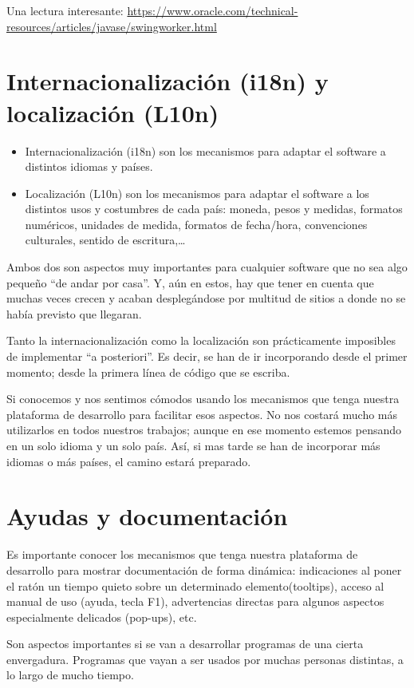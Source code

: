 \documentclass[spanish,12pt,a4paper,final,oneside]{book}
\begin{document}
Una lectura interesante: \url{https://www.oracle.com/technical-resources/articles/javase/swingworker.html}


\section{Internacionalización (i18n) y localización (L10n)}\label{ejercicio_localizacion}
\begin{itemize}
\item Internacionalización (i18n) son los mecanismos para adaptar el software a distintos idiomas y países.
\item Localización (L10n) son los mecanismos para adaptar el software a los distintos usos y costumbres de cada país: moneda, pesos y medidas, formatos numéricos, unidades de medida, formatos de fecha/hora, convenciones culturales, sentido de escritura,\ldots
\end{itemize}

Ambos dos son aspectos muy importantes para cualquier software que no sea algo pequeño ``de andar por casa''. Y, aún en estos, hay que tener en cuenta que muchas veces crecen y acaban desplegándose por multitud de sitios a donde no se había previsto que llegaran.

Tanto la internacionalización como la localización son prácticamente imposibles de implementar ``a posteriori''. Es decir, se han de ir incorporando desde el primer momento; desde la primera línea de código que se escriba.

Si conocemos y nos sentimos cómodos usando los mecanismos que tenga nuestra plataforma de desarrollo para facilitar esos aspectos. No nos costará mucho más utilizarlos en todos nuestros trabajos; aunque en ese momento estemos pensando en un solo idioma y un solo país. Así, si mas tarde se han de incorporar más idiomas o más países, el camino estará preparado.


\section{Ayudas y documentación}\label{ejercicio_ayudas}
Es importante conocer los mecanismos que tenga nuestra plataforma de desarrollo para mostrar documentación de forma dinámica: indicaciones al poner el ratón un tiempo quieto sobre un determinado elemento(tooltips), acceso al manual de uso (ayuda, tecla F1), advertencias directas para algunos aspectos especialmente delicados (pop-ups), etc.

Son aspectos importantes si se van a desarrollar programas de una cierta envergadura. Programas que vayan a ser usados por muchas personas distintas, a lo largo de mucho tiempo.
\end{document}
